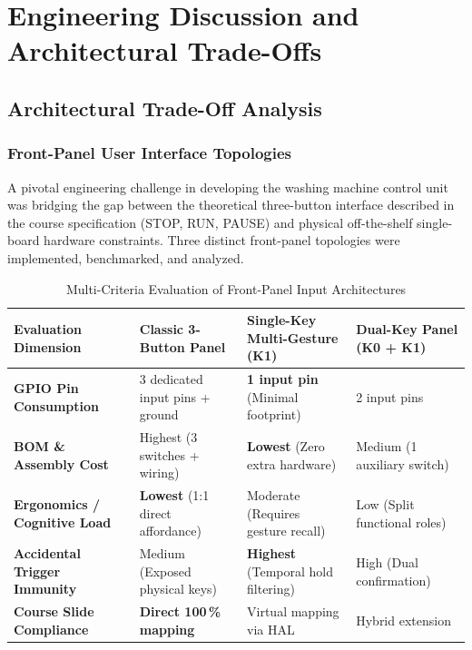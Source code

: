 \section{Engineering Discussion and Architectural Trade-Offs}
\label{sec:discussion}

\subsection{Architectural Trade-Off Analysis}

\subsubsection{Front-Panel User Interface Topologies}

A pivotal engineering challenge in developing the washing machine control unit was bridging the gap between the theoretical three-button interface described in the course specification (STOP, RUN, PAUSE) and physical off-the-shelf single-board hardware constraints. Three distinct front-panel topologies were implemented, benchmarked, and analyzed.

\begin{table}[H]
  \centering
  \caption{Multi-Criteria Evaluation of Front-Panel Input Architectures}
  \label{tab:tradeoff-ui}
  \renewcommand{\arraystretch}{1.2}
  \begin{tabularx}{\linewidth}{L{4.2cm} Y Y Y}
    \toprule
    \textbf{Evaluation Dimension} & \textbf{Classic 3-Button Panel} & \textbf{Single-Key Multi-Gesture (K1)} & \textbf{Dual-Key Panel (K0 + K1)} \\
    \midrule
    \textbf{GPIO Pin Consumption} & 3 dedicated input pins + ground & \textbf{1 input pin} (Minimal footprint) & 2 input pins \\
    \textbf{BOM \& Assembly Cost} & Highest (3 switches + wiring) & \textbf{Lowest} (Zero extra hardware) & Medium (1 auxiliary switch) \\
    \textbf{Ergonomics / Cognitive Load} & \textbf{Lowest} (1:1 direct affordance) & Moderate (Requires gesture recall) & Low (Split functional roles) \\
    \textbf{Accidental Trigger Immunity} & Medium (Exposed physical keys) & \textbf{Highest} (Temporal hold filtering) & High (Dual confirmation) \\
    \textbf{Course Slide Compliance} & \textbf{Direct 100\,\% mapping} & Virtual mapping via HAL & Hybrid extension \\
    \bottomrule
  \end{tabularx}
\end{table}

